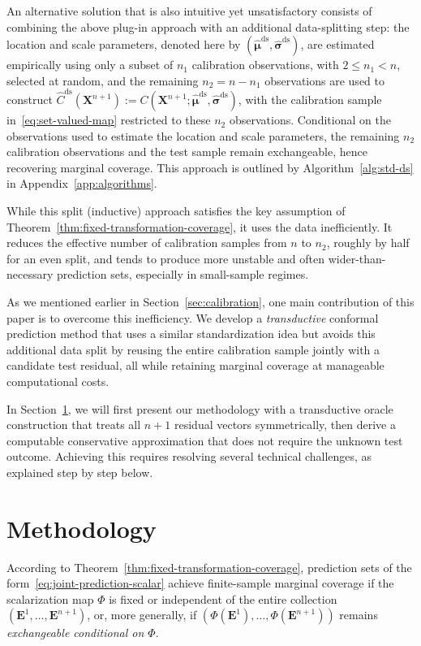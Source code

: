 An alternative solution that is also intuitive yet unsatisfactory consists of combining the above plug-in approach with an additional data-splitting step: the location and scale parameters, denoted here by $(\hat{\boldsymbol\mu}^{\mathrm{ds}},\hat{\boldsymbol\sigma}^{\mathrm{ds}})$, are estimated empirically using only a subset of $n_1$ calibration observations, with $2\leq n_1<n$, selected at random, and the remaining $n_2=n-n_1$ observations are used to construct
$\hat C^{\mathrm{ds}}(\mathbf X^{n+1}):=C(\mathbf X^{n+1};\hat{\boldsymbol\mu}^{\mathrm{ds}},\hat{\boldsymbol\sigma}^{\mathrm{ds}})$,
with the calibration sample in~\eqref{eq:set-valued-map} restricted to these $n_2$ observations. Conditional on the observations used to estimate the location and scale parameters, the remaining $n_2$ calibration observations and the test sample remain exchangeable, hence recovering marginal coverage. This approach is outlined by Algorithm~\ref{alg:std-ds} in Appendix~\ref{app:algorithms}.

While this split (inductive) approach satisfies the key assumption of Theorem~\ref{thm:fixed-transformation-coverage}, it uses the data inefficiently. It reduces the effective number of calibration samples from $n$ to $n_2$, roughly by half for an even split, and tends to produce more unstable and often wider-than-necessary prediction sets, especially in small-sample regimes.

As we mentioned earlier in Section~\ref{sec:calibration}, one main contribution of this paper is to overcome this inefficiency. We develop a \emph{transductive} conformal prediction method that uses a similar standardization idea but avoids this additional data split by reusing the entire calibration sample jointly with a candidate test residual, all while retaining marginal coverage at manageable computational costs. 

In Section~\ref{sec:methods}, we will first present our methodology with a transductive oracle construction that treats all $n+1$ residual vectors symmetrically, then derive a computable conservative approximation that does not require the unknown test outcome.
Achieving this requires resolving several technical challenges, as explained step by step below.

\section{Methodology}\label{sec:methods}

According to Theorem~\ref{thm:fixed-transformation-coverage}, prediction sets of the form~\eqref{eq:joint-prediction-scalar} achieve finite-sample marginal coverage if the scalarization map $\Phi$ is fixed or independent of the entire collection $(\mathbf E^1,\ldots,\mathbf E^{n+1})$, or, more generally, if $(\Phi(\mathbf E^1),\ldots,\Phi(\mathbf E^{n+1}))$ remains \emph{exchangeable conditional on $\Phi$}.

